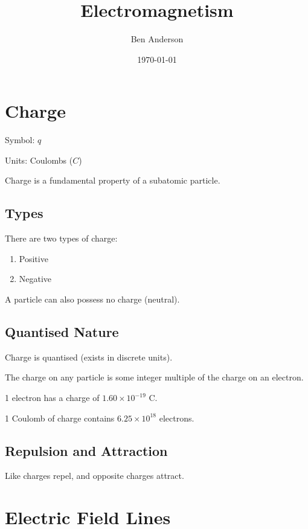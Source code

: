 \documentclass[a4paper,11pt]{article}
\begin{document}
\title{Electromagnetism}
\author{Ben Anderson}
\date{\today}
\maketitle
\pagebreak

\tableofcontents
\pagebreak


\section{Charge}

Symbol: $q$

Units: Coulombs ($C$)

Charge is a fundamental property of a subatomic particle.


\subsection{Types}

There are two types of charge:

\begin{enumerate}
\item Positive
\item Negative
\end{enumerate}

A particle can also possess no charge (neutral).


\subsection{Quantised Nature}

Charge is quantised (exists in discrete units).

The charge on any particle is some integer multiple of the charge on an
electron.

1 electron has a charge of $1.60 \times 10^{-19}\mbox{ C}$.

1 Coulomb of charge contains $6.25 \times 10^{18}$ electrons.


\subsection{Repulsion and Attraction}

Like charges repel, and opposite charges attract.




\section{Electric Field Lines}
\end{document}
